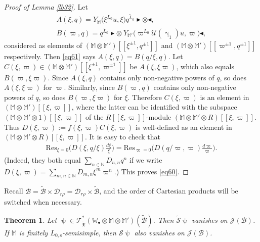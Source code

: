 \documentclass[11pt,b5paper,notitlepage]{article}
\theoremstyle{definition}
\theoremstyle{plain}
\newtheorem{thm}[df]{Theorem}
\newcommand{\fk}{\mathfrak}
\newcommand{\mc}{\mathcal}
\newcommand{\wtd}{\widetilde}
\newcommand{\Res}{\mathrm{Res}}
\newcommand{\scr}{\mathscr}
\newcommand{\blt}{\bullet}
\newcommand{\Wbb}{\mathbb W}
\newcommand{\Mbb}{\mathbb M}
\newcommand{\Nbb}{\mathbb N}
\newcommand{\btl}{\blacktriangleleft}
\newcommand{\btr}{\blacktriangleright}
\newcommand{\Lss}{{L_{0,\mathrm{s}}}}
\numberwithin{equation}{section}
\begin{document}
\begin{proof}[Proof of Lemma \ref{lb32}]
	Let 
	\begin{gather*}
	A(\xi,q)=Y_{\Mbb}\big(\xi^{L_0}u,\xi\big)q^{\wtd L_0}\btr\otimes\btl,\\
	B(\varpi,q)=q^{\wtd L_0}\btr\otimes~Y_{\Mbb'}\big(\varpi^{L_0}\mc U(\upgamma_1)u,\varpi\big)\btl,
	\end{gather*}
	considered as elements of $(\Mbb\otimes\Mbb')[[\xi^{\pm1},q^{\pm 1}]]$ and $(\Mbb\otimes\Mbb')[[\varpi^{\pm1},q^{\pm 1}]]$ respectively. Then \eqref{eq61} says $A(\xi,q)=B(q/\xi,q)$. Let $C(\xi,\varpi)\in(\Mbb\otimes\Mbb')[[\xi^{\pm 1},\varpi^{\pm1}]]$  be $A(\xi,\xi\varpi)$, which also equals $B(\varpi,\xi\varpi)$. Since $A(\xi,q)$ contains only non-negative  powers of $q$, so does $A(\xi,\xi\varpi)$ for $\varpi$.   Similarly, since $B(\varpi,q)$ contains only non-negative powers of $q$, so does $B(\varpi,\xi\varpi)$ for $\xi$. Therefore $C(\xi,\varpi)$ is an element in  $(\Mbb\otimes\Mbb')[[\xi,\varpi]]$, where the latter  can be identified with the subspace $(\Mbb\otimes\Mbb'\otimes 1)[[\xi,\varpi]]$ of the $R[[\xi,\varpi]]$-module $(\Mbb\otimes\Mbb'\otimes R)[[\xi,\varpi]]$. Thus $D(\xi,\varpi):=f(\xi,\varpi)C(\xi,\varpi)$ is well-defined as an element in $(\Mbb\otimes\Mbb'\otimes R)[[\xi,\varpi]]$. It is easy to check that
	\begin{align*}
	\Res_{\xi=0}\bigg(D(\xi,q/\xi)\frac{d\xi}{\xi}\bigg)=\Res_{\varpi=0}\bigg(D(q/\varpi,\varpi)\frac{d\varpi}{\varpi}\bigg).
	\end{align*}
	(Indeed, they both equal $\sum_{n\in\Nbb}D_{n,n}q^n$ if we write $D(\xi,\varpi)=\sum_{m,n\in\Nbb}D_{m,n}\xi^m\varpi^n$.) This proves \eqref{eq60}.
\end{proof}




Recall $\mc B=\wtd{\mc B}\times\mc D_{r\rho}=\mc D_{r\rho}\times\wtd{\mc B}$, and the order of Cartesian products will be switched when necessary.

\begin{thm}\label{lb34}
	Let $\uppsi\in\scr T_{\wtd{\fk X}}^*(\Wbb_\blt\otimes\Mbb\otimes\Mbb')(\wtd{\mc B})$. Then $\wtd{\mc S}\uppsi$ vanishes on $\scr J(\mc B)$. If $\Mbb$ is  finitely $\Lss$-semisimple, then  $\mc S\uppsi$ also vanishes on $\scr J(\mc B)$.
\end{thm}
\end{document}
